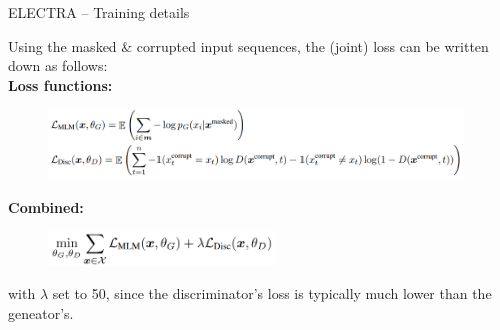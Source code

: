 \begin{frame}{ELECTRA -- Training details}

\vfill

	Using the masked \& corrupted input sequences, the (joint) loss can be written down as follows:\\
	\vspace{.3cm}
	\textbf{Loss functions:}
	\begin{figure}
		\centering
		\includegraphics[width = 11cm]{figure/61-electra-loss.png}
	\end{figure}
	
	\textbf{Combined:}
	\begin{figure}
		\centering
		\includegraphics[width = 6cm]{figure/61-electra-loss-comb.png}
	\end{figure}
	{\footnotesize with $\lambda$ set to 50, since the discriminator's loss is typically much lower than the geneator's.}
	
\vfill

\end{frame}


